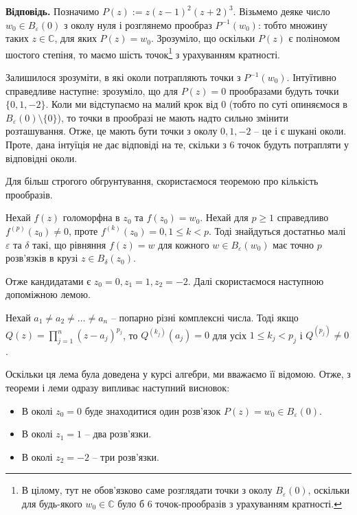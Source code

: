 \documentclass[14pt]{extarticle}
\newcommand{\<}{\langle}
\renewcommand{\>}{\rangle}
\theoremstyle{mystyle}{\newtheorem{definition}{Definition}[section]}
\theoremstyle{mystyle}{\newtheorem{proposition}[definition]{Proposition}}
\theoremstyle{mystyle}{\newtheorem{theorem}[definition]{Theorem}}
\theoremstyle{mystyle}{\newtheorem{lemma}[definition]{Lemma}}
\theoremstyle{mystyle}{\newtheorem{corollary}[definition]{Corollary}}
\theoremstyle{mystyle}{\newtheorem*{remark}{Remark}}
\theoremstyle{mystyle}{\newtheorem*{remarks}{Remarks}}
\theoremstyle{mystyle}{\newtheorem*{example}{Example}}
\theoremstyle{mystyle}{\newtheorem*{examples}{Examples}}
\theoremstyle{definition}{\newtheorem*{exercise}{Exercise}}
\theoremstyle{cstyle}{\newtheorem*{cthm}{}}
\theoremstyle{warn}
\begin{document}
\textbf{Відповідь.} Позначимо $P(z) := z(z-1)^2(z+2)^3$. Візьмемо деяке число $w_0 \in B_{\varepsilon}(0)$ з околу нуля і розглянемо прообраз $P^{-1}(w_0)$: тобто множину таких $z \in \mathbb{C}$, для яких $P(z)=w_0$. Зрозуміло, що оскільки $P(z)$ є поліномом шостого степіня, то маємо шість точок\footnote{В цілому, тут не обов'язково саме розглядати точки з околу $B_{\varepsilon}(0)$, оскільки для будь-якого $w_0 \in \mathbb{C}$ було б 6 точок-прообразів з урахуванням кратності.} з урахуванням кратності.

Залишилося зрозуміти, в які околи потрапляють точки з $P^{-1}(w_0)$. Інтуїтивно справедливе наступне: зрозуміло, що для $P(z)=0$ прообразами будуть точки $\{0,1,-2\}$. Коли ми відступаємо на малий крок від 0 (тобто по суті опиняємося в $B_{\varepsilon}(0) \setminus \{0\}$), то точки в прообразі не мають надто сильно змінити розташування. Отже, це мають бути точки з околу $0,1,-2$ -- це і є шукані околи. Проте, дана інтуїція не дає відповіді на те, скільки з $6$ точок будуть потрапляти у відповідні околи. 

Для більш строгого обгрунтування, скористаємося теоремою про кількість прообразів. 

\begin{theorem}
    Нехай $f(z)$ голоморфна в $z_0$ та $f(z_0)=w_0$. Нехай для $p \geq 1$ справедливо $f^{(p)}(z_0) \neq 0$, проте $f^{(k)}(z_0)=0, 1\leq k<p$. Тоді знайдуться достатньо малі $\varepsilon$ та $\delta$ такі, що рівняння $f(z)=w$ для кожного $w \in B_{\varepsilon}(w_0)$ має точно $p$ розв'язків в крузі $z \in B_{\delta}(z_0)$.
\end{theorem}

Отже кандидатами є $z_0=0,z_1=1,z_2=-2$. Далі скористаємося наступною допоміжною лемою.

\begin{lemma}
    Нехай $a_1 \neq a_2 \neq \dots \neq a_n$ -- попарно різні комплексні числа. Тоді якщо $Q(z) = \prod_{j=1}^n (z-a_j)^{p_j}$, то $Q^{(k_j)}(a_j)=0$ для усіх $1 \leq k_j < p_j$ і $Q^{(p_j)}\neq 0$.
\end{lemma}

Оскільки ця лема була доведена у курсі алгебри, ми вважаємо її відомою. Отже, з теореми і леми одразу випливає наступний висновок:
\begin{itemize}
    \item В околі $z_0=0$ буде знаходитися один розв'язок $P(z)=w_0 \in B_{\varepsilon}(0)$.
    \item В околі $z_1=1$ -- два розв'язки.
    \item В околі $z_2=-2$ -- три розв'язки.
\end{itemize}
\end{document}
